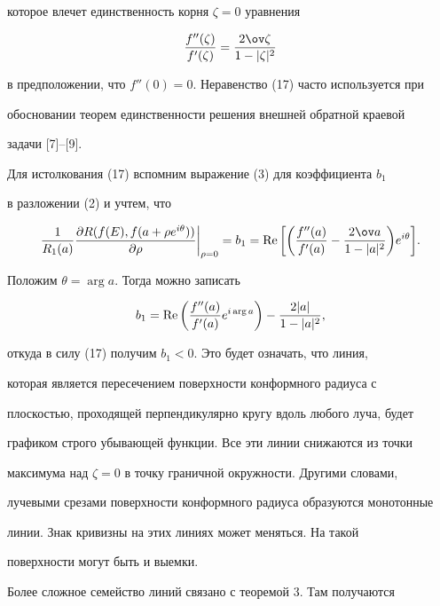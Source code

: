 которое влечет единственность корня $\zeta=0$ уравнения 


$$ 


\frac{f''(\zeta)}{f'(\zeta)}=\frac{2\ov\zeta}{1-|\zeta|^2} 


$$ 


в предположении, что $f''(0)=0$. Неравенство (17) часто используется при 


обосновании теорем единственности решения внешней обратной краевой 


задачи [7]--[9]. 


 


Для истолкования (17) вспомним выражение (3) для коэффициента $b_1$ 


в разложении (2) и учтем, что 


$$ 


\frac{1}{R_1(a)}\frac{\partial R(f(E),f(a+\rho e^{i\theta}))} 


{\partial \rho}\bigg|_{\rho=0}=b_1=\re\bigg[\bigg( 


\frac{f''(a)}{f'(a)}-\frac{2\ov a}{1-|a|^2}\bigg) 


e^{i\theta}\bigg]. 


$$ 


Положим $\theta=\arg a$. Тогда можно записать 


$$ 


b_1=\re\bigg(\frac{f''(a)}{f'(a)}e^{i\arg a}\bigg)- 


\frac{2|a|}{1-|a|^2}, 


$$ 


откуда в силу (17) получим $b_1<0$. Это будет означать, что линия, 


которая является пересечением поверхности конформного радиуса с 


плоскостью, проходящей перпендикулярно кругу вдоль любого луча, будет 


графиком строго убывающей функции. Все эти линии снижаются из точки 


максимума над $\zeta=0$ в точку граничной окружности. Другими словами, 


лучевыми срезами поверхности конформного радиуса образуются монотонные 


линии. Знак кривизны на этих линиях может меняться. На такой 


поверхности могут быть и выемки. 


 


Более сложное семейство линий связано с теоремой 3. Там получаются 


